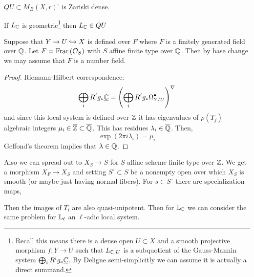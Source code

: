 \documentclass[12pt]{article}
\begin{document}
\begin{theorem}[E-Kerz, 20] 
$QU \subset M_B(X, r)^{\square}$ is Zariski dense. 
\end{theorem}

\begin{theorem}[Grothendieck]
If $L_{\mathbb{C}}$ is geometric\footnote{Recall this means there is a dense open $U \subset X$ and a smooth projective morphism $f : Y \to U$ such that $L_{\mathbb{C}}|_U$ is a subquotient of the Gauss-Mannin system $\bigoplus_{i} R^i g_* \underline{\mathbb{C}}$. By Deligne semi-simplicitly we can assume it is actually a direct summand.} then $L_{\mathbb{C}} \in QU$
\end{theorem}

\begin{theorem}[Brieskorn]
Suppose that $Y \to U \hookrightarrow X$ is defined over $F$ where $F$ is a finitely generated field over $\mathbb{Q}$. Let $F = \mathrm{Frac}\left(\mathcal{O}_{S}\right)$ with $S$ affine finite type over $\mathbb{Q}$. Then by base change we may assume that $F$ is a number field. 
\end{theorem}

\begin{proof}
Riemann-Hilbert correspondence:
\[ \bigoplus_{i} R^i g_* \underline{\mathbb{C}}  = \left( \bigoplus_{i} R^i g_* \Omega^\bullet_{Y/U} \right)^{\nabla} \]
and since this local system is defined over $\mathbb{Z}$ it has eigenvalues of $\rho(T_j)$ algebraic integers $\mu_i \in \overline{\mathbb{Z}} \subset \overline{\mathbb{Q}}$. This has residues $\lambda_i \in \overline{\mathbb{Q}}$. Then,
\[ \exp(2 \pi i \lambda_i) = \mu_i \] 
Gelfond's theorem implies that $\lambda \in \mathbb{Q}$. 
\end{proof}

Also we can spread out to $X_S \to S$ for $S$ affine scheme finite type over $\mathbb{Z}$. We get a morphism $X_F \to X_S$ and setting $S^\circ \subset S$ be a nonempty open over which $X_S$ is smooth (or maybe just having normal fibers). For $s \in S^\circ$ there are specialization maps,
\begin{center}
\end{center}
Then the images of $T_i$ are also quasi-unipotent. Then for $\mathbb{L}_{\mathbb{C}}$ we can consider the same problem for $\mathbb{L}_{\ell}$ an $\ell$-adic local system.
\end{document}
